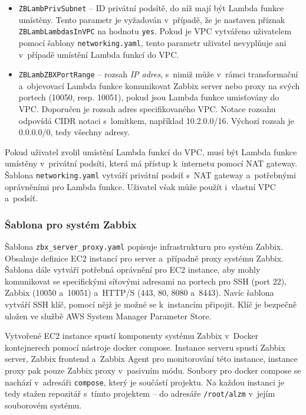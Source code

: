 \documentclass[czech, ing, kiv, he, iso690]{fasthesis}
\begin{document}
\begin{itemize}
    \item \verb|ZBLambPrivSubnet| -- ID privátní podsítě, do níž mají být Lambda funkce umístěny. Tento parametr je vyžadován v~případě, že je nastaven příznak \verb|ZBLambLambdasInVPC| na hodnotu \verb|yes|. Pokud je VPC vytvářeno uživatelem pomocí šablony \verb|networking.yaml|, tento parametr uživatel nevyplňuje ani v~případě umístění Lambda funkcí do VPC.
    \item \verb|ZBLambZBXPortRange| -- rozsah \emph{IP adres}, s~nimiž může v~rámci transformační a~objevovací Lambda funkce komunikovat Zabbix server nebo proxy na svých portech (10050, resp. 10051), pokud jsou Lambda funkce umisťovány do VPC. Doporučen je rozsah adres specifikovaného VPC. Notace rozsahu odpovídá CIDR notaci s~lomítkem, například 10.2.0.0/16. Výchozí rozsah je 0.0.0.0/0, tedy všechny adresy.
\end{itemize}

Pokud uživatel zvolil umístění Lambda funkcí do VPC, musí být Lambda funkce umístěny v~privátní podsíti, která má přístup k~internetu pomocí NAT gateway. Šablona \verb|networking.yaml| vytváří privátní podsíť s~NAT gateway a~potřebnými oprávněními pro Lambda funkce. Uživatel však může použít i~vlastní VPC a~podsíť.

\subsubsection{Šablona pro systém Zabbix}

Šablona \verb|zbx_server_proxy.yaml| popisuje infrastrukturu pro systém Zabbix. Obsahuje definice EC2 instancí pro server a~případně proxy systému Zabbix. Šablona dále vytváří potřebná oprávnění pro EC2 instance, aby mohly komunikovat se specifickými síťovými adresami na portech pro SSH (port 22), Zabbix (10050 a~10051) a~HTTP/S (443, 80, 8080 a~8443). Navíc šablona vytváří SSH klíč, pomocí nějž je možné se k~instancím připojit. Klíč je bezpečně uložen ve službě AWS System Manager Parameter Store. \cite{cloudformation.docs.aws}

Vytvořené EC2 instance spustí komponenty systému Zabbix v~Docker kontejnerech pomocí nástroje docker compose. Instance serveru spustí Zabbix server, Zabbix frontend a~Zabbix Agent pro monitorování této instance, instance proxy pak pouze Zabbix proxy v~pasivním módu. Soubory pro docker compose se nachází v~adresáři \verb|compose|, který je součástí projektu. Na každou instanci je tedy stažen repozitář s~tímto projektem -- do adresáře \verb|/root/alzm| v~jejím souborovém systému.
\end{document}
